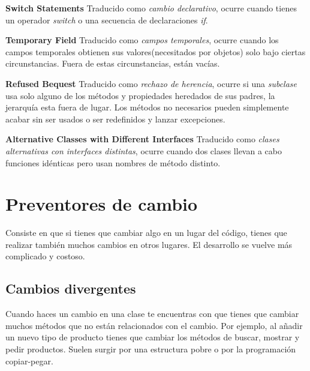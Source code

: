 \documentclass[11pt,a4paper,oneside]{book}
\begin{document}
    \textbf{Switch Statements} \newline
    Traducido como \textit{cambio declarativo}, ocurre cuando tienes un operador \textit{switch} o una secuencia de declaraciones \textit{if}.
    \newline
    
    \textbf{Temporary Field}  \newline
    Traducido como \textit{campos temporales}, ocurre cuando los campos temporales obtienen sus valores(necesitados por objetos) solo bajo ciertas circunstancias. Fuera de estas circunstancias, están vacías.
    \newline
    
    \textbf{Refused Bequest}  \newline
    Traducido como \textit{rechazo de herencia}, ocurre si una \textit{subclase} usa solo alguno de los métodos y propiedades heredados de sus padres, la jerarquía esta fuera de lugar. Los métodos no necesarios pueden simplemente acabar sin ser usados o ser redefinidos y lanzar excepciones.
    \newline
    
    \textbf{Alternative Classes with Different Interfaces}  \newline
    Traducido como \textit{clases alternativas con interfaces distintas}, ocurre cuando dos clases llevan a cabo funciones idénticas pero usan nombres de método distinto.
    \newline



\section{Preventores de cambio}

Consiste en que si tienes que cambiar algo en un lugar del código, tienes que realizar también muchos cambios en otros lugares. El desarrollo se vuelve más complicado y costoso.

\subsection{Cambios divergentes}
\label{cambiosdivergentes}
Cuando haces un cambio en una clase te encuentras con que tienes que cambiar muchos métodos que no están relacionados con el cambio. Por ejemplo, al añadir un nuevo tipo de producto tienes que cambiar los métodos de buscar, mostrar y pedir productos.
\newline
Suelen surgir por una estructura pobre o por la programación copiar-pegar.
\end{document}
